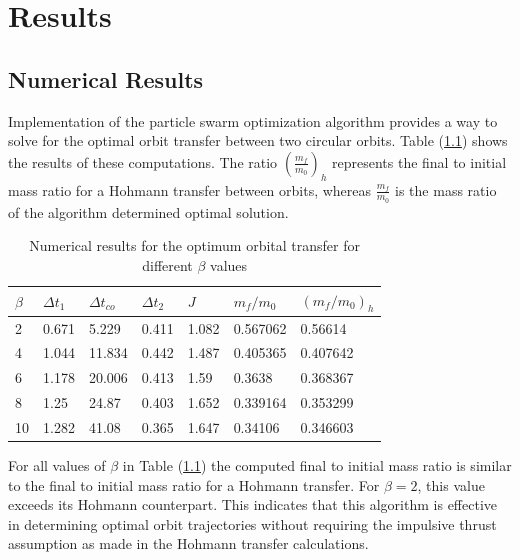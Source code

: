 \chapter{Results}


\section{Numerical Results}

\noindent Implementation of the particle swarm optimization algorithm provides a way to solve
for the optimal orbit transfer between two circular orbits. Table (\ref{tab:Numerical-Results}) shows
the results of these computations. The ratio $(\frac{m_f}{m_{0}})_h$ represents the final to initial mass
ratio for a Hohmann transfer between orbits, whereas $\frac{m_f}{m_0}$ is the mass ratio of the algorithm 
determined optimal solution.


\begin{table}[H]
  \centering
  \begin{tabular}{@{}lllllll@{}}
  \toprule
  $\beta$ & $\Delta t_1$ & $\Delta t_{co}$ & $\Delta t_2$ & $J$ & $m_f/m_0$ & $(m_f/m_0)_h$ \\ \midrule
  2 & 0.671 & 5.229 & 0.411 & 1.082 & 0.567062 & 0.56614 \\
  4 & 1.044 & 11.834 & 0.442 & 1.487 & 0.405365 & 0.407642 \\
  6 & 1.178 & 20.006 & 0.413 & 1.59 & 0.3638 & 0.368367 \\
  8 & 1.25 & 24.87 & 0.403 & 1.652 & 0.339164 & 0.353299 \\
  10 & 1.282 & 41.08 & 0.365 & 1.647 & 0.34106 & 0.346603 \\ \bottomrule
  \end{tabular}
  \caption{Numerical results for the optimum orbital transfer for different $\beta$ values }
  \label{tab:Numerical-Results}
  \end{table}

\noindent For all values of $\beta$ in Table (\ref{tab:Numerical-Results}) the computed final to initial mass ratio is similar to the final to 
initial mass ratio for a Hohmann transfer. For $\beta = 2$, this value exceeds its Hohmann
counterpart. This indicates that this algorithm is effective in determining optimal orbit trajectories without
requiring the impulsive thrust assumption as made in the Hohmann transfer calculations.

